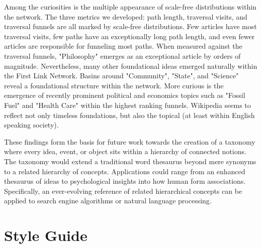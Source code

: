 \documentclass[twoside]{article}
\begin{document}
Among the curiosities is the multiple appearance of scale-free distributions within the network. 
The three metrics we developed: path length, traversal visits, and traversal funnels are all marked 
by scale-free distributions. Few articles have most traversal visits, few paths have an exceptionally long path length, and even fewer
articles are responsible for funneling most paths. When measured against the traversal funnels, 
"Philosophy" emerges as an exceptional article by orders of magnitude. 
Nevertheless, many other foundational ideas emerged naturally within the First Link Network. 
Basins around "Community", "State", and "Science" reveal a foundational structure within the network. 
More curious is the emergence of recently prominent political and economics topics such as "Fossil Fuel" and "Health Care" 
within the highest ranking funnels. 
Wikipedia seems to reflect not only timeless foundations, but also the topical (at least within English speaking society).


These findings form the basis for future work towards the creation of a taxonomy where 
every idea, event, or object sits within a hierarchy of connected notions.
The taxonomy would extend a traditional word thesaurus beyond mere synonyms to a related hierarchy of concepts.
Applications could range from an enhanced thesaurus of ideas to psychological insights into how human form associations.
Specifically, an ever-evolving reference of related hierarchical concepts can be applied to search engine algorithms 
or natural language processing.


\newpage
\section*{Style Guide}
\end{document}
